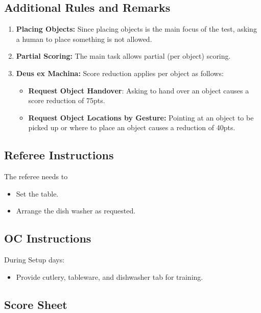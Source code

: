 \subsection*{Additional Rules and Remarks}
\begin{enumerate}[nosep]
	\item \textbf{Placing Objects:} Since placing objects is the main focus of the test, asking a human to place something is not allowed.

	\item \textbf{Partial Scoring:} The main task allows partial (per object) scoring.

	\item \textbf{Deus ex Machina:} Score reduction applies per object as follows:
	\begin{itemize}[nosep]
		\item \textbf{Request Object Handover}: Asking to hand over an object causes a score reduction of 75pts.
		\item \textbf{Request Object Locations by Gesture:} Pointing at an object to be picked up or where to place an object causes a reduction of 40pts.

	\end{itemize}

\end{enumerate}

\newpage

\subsection*{Referee Instructions}

The referee needs to
\begin{itemize}
	\item Set the table.
	\item Arrange the dish washer as requested.
\end{itemize}

\subsection*{OC Instructions}
During Setup days:
\begin{itemize}
	\item Provide cutlery, tableware, and dishwasher tab for training.
\end{itemize}

\subsection*{Score Sheet}


